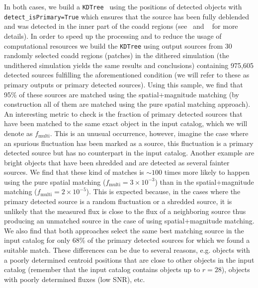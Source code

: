 \documentclass[twocolumn]{aastex62}
\begin{document}
In both cases, we build a \texttt{KDTree}~\citep{scikit-learn} using the positions of detected objects with \texttt{detect\_isPrimary=True} which ensures that the source has been fully deblended and was detected in the inner part of the coadd regions (see~\citet{2018PASJ...70S...5B} and ~\citet{2018PASJ...70S..25M} for more details). In order to speed up the processing and to reduce the usage of computational resources we build the \texttt{KDTree} using output sources from 30 randomly selected coadd regions (patches) in the dithered simulation (the undithered simulation yields the same results and conclusions) containing 975,605 detected sources fulfilling the aforementioned condition (we will refer to these as primary outputs or primary detected sources). Using this sample, we find that 95\% of these sources are matched using the spatial+magnitude matching (by construction all of them are matched using the pure spatial matching approach). An interesting metric to check is the fraction of primary detected sources that have been matched to the same exact object in the input catalog, which we will denote as $f_{\mathrm{multi}}$. This is an unusual occurrence, however, imagine the case where an spurious fluctuation has been marked as a source, this fluctuation is a primary detected source but has no counterpart in the input catalog. Another example are bright objects that have been shredded and are detected as several fainter sources. We find that these kind of matches is $\sim 100$ times more likely to happen using the pure spatial matching ($f_{\mathrm{multi}} = 3 \times 10^{-3}$) than in the spatial+magnitude matching ($ f_{\mathrm{multi}} = 2 \times 10^{-5}$). This is expected because, in the cases where the primary detected source is a random fluctuation or a shredded source, it is unlikely that the measured flux is close to the flux of a neighboring source thus producing an unmatched source in the case of using spatial+magnitude matching. We also find that both approaches select the same best matching source in the input catalog for only 68\% of the primary detected sources for which we found a suitable match. These differences can be due to several reasons, e.g. objects with a poorly determined centroid positions that are close to other objects in the input catalog (remember that the input catalog contains objects up to $r=28$), objects with poorly determined fluxes (low SNR), etc.
\end{document}
